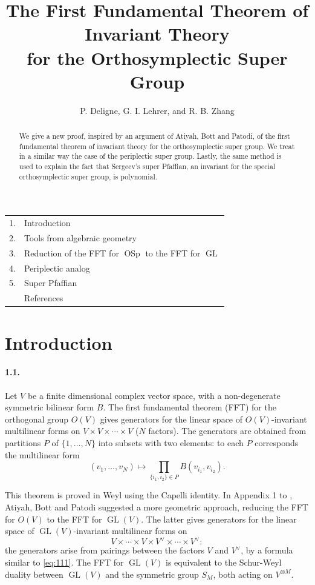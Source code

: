 \documentclass[11pt]{article}
\title{The First Fundamental Theorem of Invariant Theory\\for the Orthosymplectic Super Group}
\author{P. Deligne, G. I. Lehrer, and R. B. Zhang}
\date{}
\newcommand{\GL}{\operatorname{GL}}
\newcommand{\OSp}{\operatorname{OSp}}
\begin{document}
\maketitle
\begin{abstract}
We give a new proof, inspired by an argument of Atiyah, Bott and Patodi, of the first fundamental theorem of invariant theory for the orthosymplectic super group. We treat in a similar way the case of the periplectic super group. Lastly, the same method is used to explain the fact that Sergeev's super Pfaffian, an invariant for the special orthosymplectic super group, is polynomial.
\end{abstract}

\begin{center}
\begin{tabular}{rl}
1. & Introduction\\
2. & Tools from algebraic geometry\\
3. & Reduction of the FFT for $\OSp$ to the FFT for $\GL$\\
4. & Periplectic analog\\
5. & Super Pfaffian\\
& References
\end{tabular}
\end{center}

\section{Introduction}

\paragraph{1.1.}
Let $V$ be a finite dimensional complex vector space, with a non-degenerate symmetric bilinear form $B$. The first fundamental theorem (FFT) for the orthogonal group $O(V)$ gives generators for the linear space of $O(V)$-invariant multilinear forms on $V\times V\times\cdots\times V$ ($N$ factors). The generators are obtained from partitions $P$ of $\{1,\ldots,N\}$ into subsets with two elements: to each $P$ corresponds the multilinear form
\begin{equation}
\label{eq:111}
(v_1,\ldots,v_N)\longmapsto \prod_{\{i_1,i_2\}\in P} B(v_{i_1},v_{i_2}).
\end{equation}

This theorem is proved in Weyl \cite{Weyl46} using the Capelli identity. In Appendix 1 to \cite{ABP73}, Atiyah, Bott and Patodi suggested a more geometric approach, reducing the FFT for $O(V)$ to the FFT for $\GL(V)$. The latter gives generators for the linear space of $\GL(V)$-invariant multilinear forms on
\[
V\times\cdots\times V\times V^\vee\times\cdots\times V^\vee:
\]
the generators arise from pairings between the factors $V$ and $V^\vee$, by a formula similar to \eqref{eq:111}. The FFT for $\GL(V)$ is equivalent to the Schur-Weyl duality between $\GL(V)$ and the symmetric group $S_M$, both acting on $V^{\otimes M}$.
\end{document}
